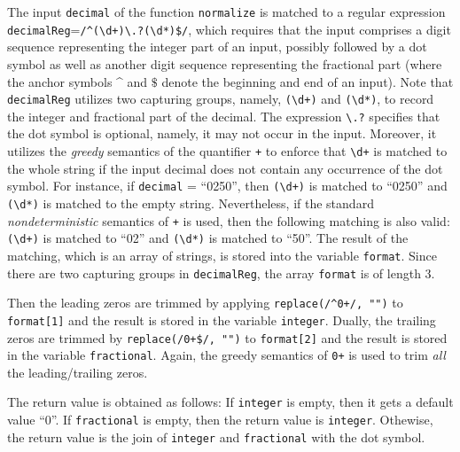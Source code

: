 The input {\tt decimal} of the function {\tt normalize} is matched to a regular expression {\tt decimalReg}={\tt /\^{}({\footnotesize\textbackslash}d+){\footnotesize\textbackslash}.?({\footnotesize\textbackslash}d*)\$/}, which requires that  the input comprises a digit sequence representing the integer part of an input, possibly followed by a dot symbol as well as another digit sequence representing the fractional part (where the anchor symbols \^{} and $\$$ denote the beginning and end of an input). Note that  {\tt decimalReg} utilizes two capturing groups, namely, {\tt ({\footnotesize\textbackslash}d+)} and {\tt ({\footnotesize\textbackslash}d*)}, to record the integer and fractional part of the decimal. The expression {\tt {\footnotesize\textbackslash}.?} specifies that the dot symbol is optional, namely, it may not occur in the input. Moreover, it utilizes the \emph{greedy} semantics of the quantifier {\tt +} to enforce that {\tt {\footnotesize\textbackslash}d+} is matched to the whole string if the input decimal does not contain any occurrence of the dot symbol. For instance, if {\tt decimal} = ``0250'', then {\tt ({\footnotesize\textbackslash}d+)} is matched to ``0250'' and  {\tt ({\footnotesize\textbackslash}d*)} is matched to the empty string. Nevertheless, if the standard \emph{nondeterministic} semantics of {\tt +} is used, then the following matching is also valid: {\tt ({\footnotesize\textbackslash}d+)} is matched to ``02'' and {\tt ({\footnotesize\textbackslash}d*)} is matched to ``50''. The result of the matching, which is an array of strings, is stored into the variable {\tt format}. Since there are two capturing groups in {\tt decimalReg}, the array {\tt format} is of length 3.

Then the leading zeros are trimmed by applying {\tt replace(/\^{}0+/, "")} to {\tt format[1]} and the result is stored in the variable {\tt integer}. Dually, the trailing zeros are trimmed by {\tt replace(/{}0+\$/, "")} to {\tt format[2]} and the result is stored in the variable {\tt fractional}. Again, the greedy semantics of {\tt 0+} is used to trim \emph{all} the leading/trailing zeros.

The return value is obtained as follows: If {\tt integer} is empty, then it gets a default value ``0''. If {\tt fractional} is empty, then the return value is {\tt integer}. Othewise, the return value is the join of {\tt integer} and {\tt fractional} with the dot symbol. 

